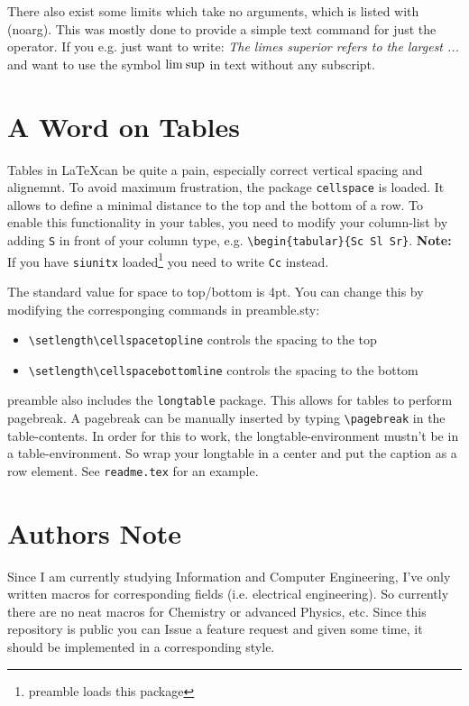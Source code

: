 \documentclass{report}
\begin{document}
  There also exist some limits which take no arguments, which is listed with (noarg). This was mostly done
  to provide a simple text command for just the operator. If you e.g. just want to write: 
  \textit{The limes superior refers to the largest ...} and want to use the symbol $\mathrm{lim}\:\mathrm{sup}$ in text without any
  subscript.

  \section{A Word on Tables}
    Tables in \LaTeX can be quite a pain, especially correct vertical spacing and alignemnt. To avoid maximum 
    frustration, the package \lstinline|cellspace| is loaded. It allows to define a minimal distance to the top
    and the bottom of a row. To enable this functionality in your tables, you need to modify your column-list by
    adding \lstinline|S| in front of your column type, e.g. \lstinline|\begin{tabular}{Sc Sl Sr}|. 
    \textbf{Note:} If you have \lstinline|siunitx| loaded\footnote{preamble loads this package} you need to
    write \lstinline|Cc| instead.  

    The standard value for space to top/bottom is 4pt. You can change this by modifying the corresponging commands
    in preamble.sty:
    \begin{itemize}
      \item \lstinline|\setlength\cellspacetopline|  controls the spacing to the top
      \item \lstinline|\setlength\cellspacebottomline| controls the spacing to the bottom
    \end{itemize}

    preamble also includes the \lstinline|longtable| package. This allows for tables to perform pagebreak. A
    pagebreak can be manually inserted by typing \lstinline|\pagebreak| in the table-contents. In order for
    this to work, the longtable-environment mustn't be in a table-environment. So wrap your longtable in
    a center and put the caption as a row element. See \lstinline|readme.tex| for an example.

  \section{Authors Note}
    Since I am currently studying Information and Computer Engineering, I've only written macros for 
    corresponding fields (i.e. electrical engineering). So currently there are no neat macros for Chemistry or
    advanced Physics, etc. Since this repository is public you can Issue a feature request and given some 
    time, it should be implemented in a corresponding style.
\end{document}
